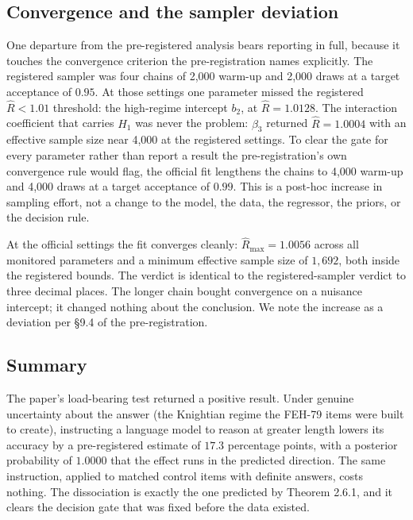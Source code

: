\documentclass{article}
\begin{document}
\subsection{Convergence and the sampler
deviation}\label{convergence-and-the-sampler-deviation}

One departure from the pre-registered analysis bears reporting in full,
because it touches the convergence criterion the pre-registration names
explicitly. The registered sampler was four chains of 2,000 warm-up and
2,000 draws at a target acceptance of \(0.95\). At those settings one
parameter missed the registered \(\widehat{R} < 1.01\) threshold: the
high-regime intercept \(b_{2}\), at \(\widehat{R} = 1.0128\). The
interaction coefficient that carries \(H_{1}\) was never the problem:
\(\beta_{3}\) returned \(\widehat{R} = 1.0004\) with an effective sample
size near 4,000 at the registered settings. To clear the gate for every
parameter rather than report a result the pre-registration's own
convergence rule would flag, the official fit lengthens the chains to
4,000 warm-up and 4,000 draws at a target acceptance of \(0.99\). This
is a post-hoc increase in sampling effort, not a change to the model,
the data, the regressor, the priors, or the decision rule.

At the official settings the fit converges cleanly:
\({\widehat{R}}_{\max} = 1.0056\) across all monitored parameters and a
minimum effective sample size of \(1,692\), both inside the registered
bounds. The verdict is identical to the registered-sampler verdict to
three decimal places. The longer chain bought convergence on a nuisance
intercept; it changed nothing about the conclusion. We note the increase
as a deviation per \S{}9.4 of the pre-registration.

\subsection{Summary}\label{summary-2}

The paper's load-bearing test returned a positive result. Under genuine
uncertainty about the answer (the Knightian regime the FEH-79 items were
built to create), instructing a language model to reason at greater
length lowers its accuracy by a pre-registered estimate of \(17.3\)
percentage points, with a posterior probability of \(1.0000\) that the
effect runs in the predicted direction. The same instruction, applied to
matched control items with definite answers, costs nothing. The
dissociation is exactly the one predicted by Theorem 2.6.1, and it
clears the decision gate that was fixed before the data existed.
\end{document}
